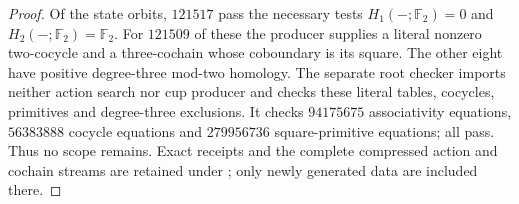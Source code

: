 \begin{proof}
Of the state orbits, $121517$ pass the necessary tests
$H_1(-;\mathbb F_2)=0$ and $H_2(-;\mathbb F_2)=\mathbb F_2$.
For $121509$ of these the producer supplies a literal nonzero
two-cocycle and a three-cochain whose coboundary is its square.
The other eight have positive degree-three mod-two homology.
The separate root checker 
imports neither action search nor cup producer and checks these
literal tables, cocycles, primitives and degree-three exclusions.
It checks $94175675$ associativity equations, $56383888$ cocycle
equations and $279956736$ square-primitive equations; all pass.
Thus no scope remains. Exact receipts and the complete compressed
action and cochain streams are retained under
; only newly generated data
are included there.
\end{proof}
